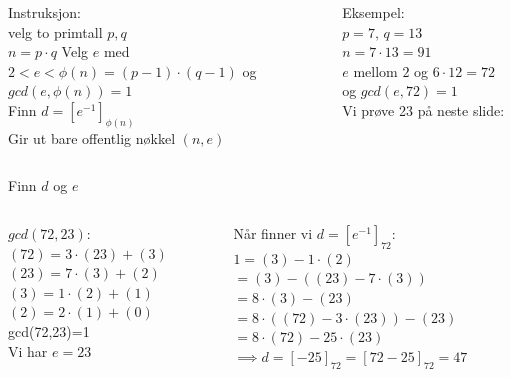 \begin{frame}{}
    \begin{columns}
        \begin{column}{0.45 \textwidth}
            Instruksjon:\\
            velg to primtall $p,q$\\
            $n=p\cdot q$
            Velg $e$ med $2<e<\phi(n)=(p-1)\cdot (q-1)$ og $gcd(e,\phi(n))=1$\\
            Finn $d=[e^{-1}]_{\phi(n)}$\\
            Gir ut bare offentlig nøkkel $(n,e)$
        \end{column}
        \begin{column}{0.45 \textwidth}
            Eksempel:\\
            $p=7,\,q=13$\\
            $n=7\cdot 13=91$\\
            $e$ mellom $2$ og $6\cdot 12=72$ og $gcd(e,72)=1$\\
            Vi prøve 23 på neste slide:
        \end{column}
    \end{columns}
\end{frame}

\begin{frame}{Finn $d$ og $e$}
    \begin{columns}
        \begin{column}{0.45 \textwidth}
            $gcd(72,23):$\\
            $(72)=3\cdot (23)+(3)$\\
            $(23)=7\cdot(3)+(2)$\\
            $(3)=1\cdot (2)+(1)$\\
            $(2)=2\cdot (1)+(0)$\\
            gcd(72,23)=1\\
            Vi har $e=23$
        \end{column}
        \begin{column}{0.45 \textwidth}
            Når finner vi $d=[e^{-1}]_{72}$:\\
            $1=(3)-1\cdot (2)$\\
            $=(3)-((23)-7\cdot (3))$\\
            $=8\cdot (3)-(23)$\\
            $=8\cdot ((72)-3\cdot (23))-(23)$\\
            $=8\cdot (72)-25\cdot (23)$\\
            $\implies d=[-25]_{72}=[72-25]_{72}=47$
        \end{column}
    \end{columns}
\end{frame}

